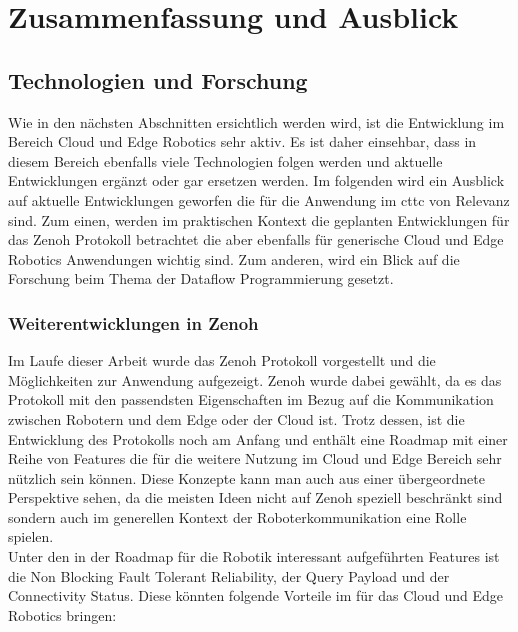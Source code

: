 \section{Zusammenfassung und Ausblick} %
\label{sec:Zusammenfassung und Ausblick}

\subsection{Technologien und Forschung} %
\label{sub:Technologien}

Wie in den nächsten Abschnitten ersichtlich werden wird, ist die Entwicklung im Bereich Cloud und Edge Robotics sehr aktiv. Es ist daher einsehbar, dass in diesem Bereich ebenfalls viele Technologien folgen werden und aktuelle Entwicklungen ergänzt oder gar ersetzen werden. Im folgenden wird ein Ausblick auf aktuelle Entwicklungen geworfen die für die Anwendung im \acrlong{cttc} von Relevanz sind. Zum einen, werden im praktischen Kontext die geplanten Entwicklungen für das Zenoh Protokoll betrachtet die aber ebenfalls für generische Cloud und Edge Robotics Anwendungen wichtig sind. Zum anderen, wird ein Blick auf die Forschung beim Thema der Dataflow Programmierung gesetzt.

\subsubsection{Weiterentwicklungen in Zenoh} %
\label{ssub:Weiterentwicklungen in Zenoh}

Im Laufe dieser Arbeit wurde das Zenoh Protokoll vorgestellt und die Möglichkeiten zur Anwendung aufgezeigt. Zenoh wurde dabei gewählt, da es das Protokoll mit den passendsten Eigenschaften im Bezug auf die Kommunikation zwischen Robotern und dem Edge oder der Cloud ist. Trotz dessen, ist die Entwicklung des Protokolls noch am Anfang und enthält eine Roadmap \cite{Eclipsezenoh} mit einer Reihe von Features die für die weitere Nutzung im Cloud und Edge Bereich sehr nützlich sein können. Diese Konzepte kann man auch aus einer übergeordnete Perspektive sehen, da die meisten Ideen nicht auf Zenoh speziell beschränkt sind sondern auch im generellen Kontext der Roboterkommunikation eine Rolle spielen.\\
Unter den in der Roadmap für die Robotik interessant aufgeführten Features ist die Non Blocking Fault Tolerant Reliability, der Query Payload und der Connectivity Status. Diese könnten folgende Vorteile im für das Cloud und Edge Robotics bringen:

